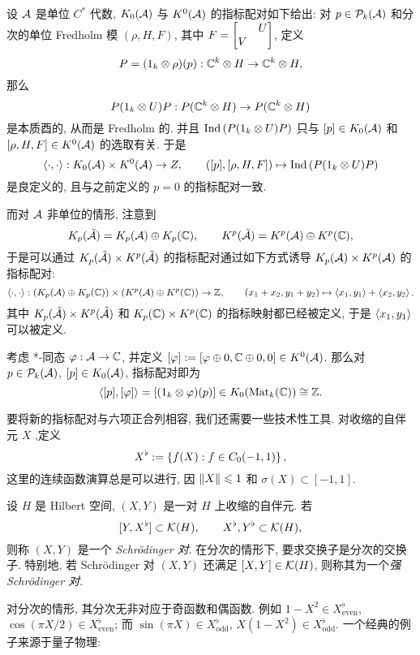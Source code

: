 \begin{De-Pr}
	设 $ \mathcal{A} $ 是单位 $ C^* $ 代数, $ K_0(\mathcal{A}) $ 与 $ K^0(\mathcal{A}) $ 的指标配对如下给出: 对 $ p\in\mathcal{P}_k(\mathcal{A}) $ 和分次的单位 Fredholm 模 $ (\rho, H, F) $, 其中 $ F=\mqty[& U \\ V &] $, 定义
	\[
		P=(1_k\otimes\rho)(p) : \mathbb{C}^k\otimes H\to \mathbb{C}^k\otimes H,
	\]
	那么
	\[
		P(1_k\otimes U)P : P(\mathbb{C}^k\otimes H)\to P(\mathbb{C}^k\otimes H)
	\]
	是本质酉的, 从而是 Fredholm 的. 并且 $ \mathrm{Ind}\,(P(1_k\otimes U)P) $ 只与 $ [p]\in K_0(\mathcal{A}) $ 和 $ [\rho, H, F]\in K^0(\mathcal{A}) $ 的选取有关. 于是
	\[
		\left\langle \cdot,\cdot \right\rangle : K_0(\mathcal{A})\times K^0(\mathcal{A})\to Z,\qquad ([p],[\rho, H, F])\mapsto\mathrm{Ind}\,(P(1_k\otimes U)P)
	\]
	是良定义的, 且与之前定义的 $ p=0 $ 的指标配对一致.
\end{De-Pr}

而对 $ \mathcal{A} $ 非单位的情形, 注意到
\[
	K_p(\tilde{\mathcal{A}})=K_p(\mathcal{A})\oplus K_p(\mathbb{C}),\qquad K^p(\tilde{\mathcal{A}})=K^p(\mathcal{A})\oplus K^p(\mathbb{C}),
\]
于是可以通过 $ K_p(\tilde{\mathcal{A}})\times K^p(\tilde{\mathcal{A}}) $ 的指标配对通过如下方式诱导 $ K_p(\mathcal{A})\times K^p(\mathcal{A}) $ 的指标配对:
\[
	\left\langle \cdot,\cdot \right\rangle : (K_p(\mathcal{A})\oplus K_p(\mathbb{C}))\times(K^p(\mathcal{A})\oplus K^p(\mathbb{C}))\to\mathbb{Z},\qquad (x_1+x_2,y_1+y_2)\mapsto\left\langle x_1,y_1 \right\rangle+\left\langle x_2,y_2 \right\rangle.
\]
其中 $ K_p(\tilde{\mathcal{A}})\times K^p(\tilde{\mathcal{A}}) $ 和 $ K_p(\mathbb{C})\times K^p(\mathbb{C}) $ 的指标映射都已经被定义, 于是 $ \left\langle x_1,y_1 \right\rangle $ 可以被定义.

\begin{Example}
	考虑 *-同态 $ \varphi : \mathcal{A}\to\mathbb{C} $, 并定义 $ [\varphi]:=[\varphi\oplus 0,\mathbb{C}\oplus 0, 0]\in K^0(\mathcal{A}) $. 那么对 $ p\in\mathcal{P}_k(\mathcal{A}) $, $ [p]\in K_0(\mathcal{A}) $, 指标配对即为
	\[
		\left\langle [p],[\varphi] \right\rangle=[(1_k\otimes\varphi)(p)]\in K_0(\mathrm{Mat}_k(\mathbb{C}))\cong\mathbb{Z}.
	\]
\end{Example}

要将新的指标配对与六项正合列相容, 我们还需要一些技术性工具. 对收缩的自伴元 $ X $ ,定义
\[
	X^\flat:=\left\{ f(X) : f\in C_0(-1,1) \right\},
\]
这里的连续函数演算总是可以进行, 因 $ \left\| X \right\|\leqslant 1 $ 和 $ \sigma(X)\subset[-1,1] $.

\begin{Definition}
	设 $ H $ 是 Hilbert 空间, $ (X,Y) $ 是一对 $ H $ 上收缩的自伴元. 若
	\[
		[Y,X^\flat]\subset\mathcal{K}(H),\qquad X^\flat, Y^\flat\subset\mathcal{K}(H),
	\]
	则称 $ (X,Y) $ 是一个 \emph{Schr\"odinger 对}. 在分次的情形下, 要求交换子是分次的交换子. 特别地, 若 Schr\"odinger 对 $ (X,Y) $ 还满足 $ [X,Y]\in\mathcal{K}(H) $, 则称其为一个\emph{强 Schr\"odinger 对}.
\end{Definition}

对分次的情形, 其分次无非对应于奇函数和偶函数. 例如 $ 1-X^2\in X^{\flat}_{\text{even}} $, $ \cos(\pi X/2)\in X^\flat_{\text{even}} $; 而 $ \sin(\pi X)\in X^\flat_{\text{odd}} $, $ X(1-X^2)\in X^\flat_{\text{odd}} $. 一个经典的例子来源于量子物理:

